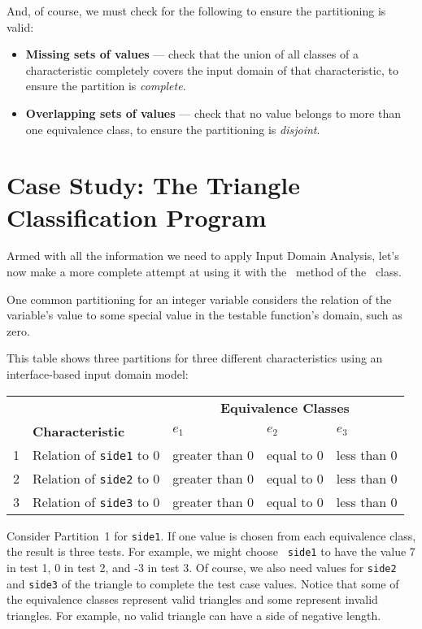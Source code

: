 And, of course, we must check for the following to ensure the partitioning is
valid:

\begin{itemize}

    \item {\bf Missing sets of values} --- check that the union of all classes
    of a characteristic completely covers the input domain of that
    characteristic, to ensure the partition is {\it complete}.
    
    \item {\bf Overlapping sets of values} --- check that no value belongs to
    more than one equivalence class, to ensure the partitioning is {\it
    disjoint}.
    
\end{itemize}

\section{Case Study: The Triangle Classification Program}

Armed with all the information we need to apply Input Domain Analysis, let's now
make a more complete attempt at using it with the \classifymethod~method of the
\triangleclass~class. 

One common partitioning for an integer variable considers the relation of the
variable's value to some special value in the testable function's domain, such
as zero.

This table shows three partitions for three different characteristics using an
interface-based input domain model:

\begin{center}
\begin{tabular}{rllll}
    \toprule
    & & \multicolumn{3}{c}{\bf Equivalence Classes} \\
    \cline{3-5}
    & {\bf Characteristic} & $e_1$ & $e_2$ & $e_3$ \\
    \midrule
    1 & Relation of {\tt side1} to 0 & greater than 0 & equal to 0 & less than 0 \\
    2 & Relation of {\tt side2} to 0 & greater than 0 & equal to 0 & less than 0 \\
    3 & Relation of {\tt side3} to 0 & greater than 0 & equal to 0 & less than 0 \\
    \bottomrule    
\end{tabular}
\end{center}

Consider Partition~1 for {\tt side1}. If one value is chosen from each
equivalence class, the result is three tests. For example, we might choose {\tt
side1} to have the value 7 in test 1, 0 in test 2, and -3 in test 3. Of course,
we also need values for {\tt side2} and {\tt side3} of the triangle to complete
the test case values. Notice that some of the equivalence classes represent
valid triangles and some represent invalid triangles. For example, no valid
triangle can have a side of negative length. 

